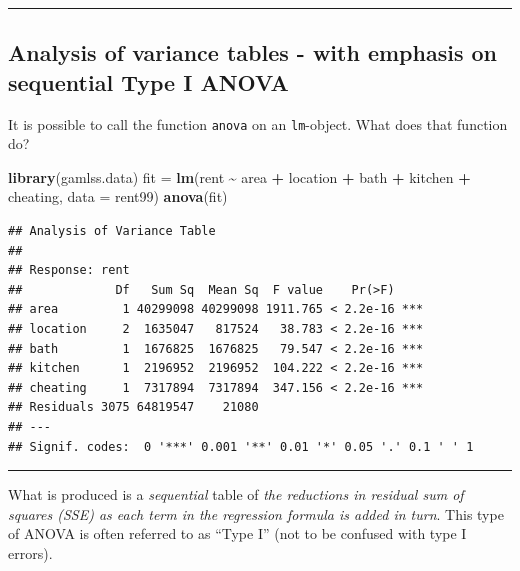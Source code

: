 \documentclass[
]{article}
\newenvironment{Shaded}{\begin{snugshade}}{\end{snugshade}}
\newcommand{\AttributeTok}[1]{\textcolor[rgb]{0.13,0.29,0.53}{#1}}
\newcommand{\FunctionTok}[1]{\textcolor[rgb]{0.13,0.29,0.53}{\textbf{#1}}}
\newcommand{\NormalTok}[1]{#1}
\newcommand{\OtherTok}[1]{\textcolor[rgb]{0.56,0.35,0.01}{#1}}
\newcommand{\SpecialCharTok}[1]{\textcolor[rgb]{0.81,0.36,0.00}{\textbf{#1}}}
\begin{document}
\begin{center}\rule{0.5\linewidth}{0.5pt}\end{center}

\hypertarget{analysis-of-variance-tables---with-emphasis-on-sequential-type-i-anova}{%
\subsection{Analysis of variance tables - with emphasis on sequential
Type I
ANOVA}\label{analysis-of-variance-tables---with-emphasis-on-sequential-type-i-anova}}

It is possible to call the function \texttt{anova} on an
\texttt{lm}-object. What does that function do?

\begin{Shaded}
\begin{Highlighting}[]
\FunctionTok{library}\NormalTok{(gamlss.data)}
\NormalTok{fit }\OtherTok{=} \FunctionTok{lm}\NormalTok{(rent }\SpecialCharTok{\textasciitilde{}}\NormalTok{ area }\SpecialCharTok{+}\NormalTok{ location }\SpecialCharTok{+}\NormalTok{ bath }\SpecialCharTok{+}\NormalTok{ kitchen }\SpecialCharTok{+}\NormalTok{ cheating, }\AttributeTok{data =}\NormalTok{ rent99)}
\FunctionTok{anova}\NormalTok{(fit)}
\end{Highlighting}
\end{Shaded}

\begin{verbatim}
## Analysis of Variance Table
## 
## Response: rent
##             Df   Sum Sq  Mean Sq  F value    Pr(>F)    
## area         1 40299098 40299098 1911.765 < 2.2e-16 ***
## location     2  1635047   817524   38.783 < 2.2e-16 ***
## bath         1  1676825  1676825   79.547 < 2.2e-16 ***
## kitchen      1  2196952  2196952  104.222 < 2.2e-16 ***
## cheating     1  7317894  7317894  347.156 < 2.2e-16 ***
## Residuals 3075 64819547    21080                       
## ---
## Signif. codes:  0 '***' 0.001 '**' 0.01 '*' 0.05 '.' 0.1 ' ' 1
\end{verbatim}

\begin{center}\rule{0.5\linewidth}{0.5pt}\end{center}

What is produced is a \emph{sequential} table of \emph{the reductions in
residual sum of squares (SSE) as each term in the regression formula is
added in turn}. This type of ANOVA is often referred to as ``Type I''
(not to be confused with type I errors).
\end{document}
